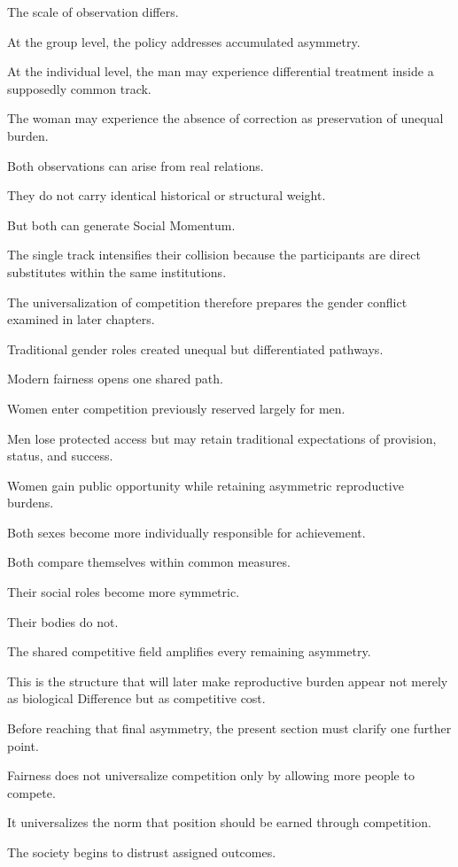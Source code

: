 The scale of observation differs.

At the group level, the policy addresses accumulated asymmetry.

At the individual level, the man may experience differential treatment inside a supposedly common track.

The woman may experience the absence of correction as preservation of unequal burden.

Both observations can arise from real relations.

They do not carry identical historical or structural weight.

But both can generate Social Momentum.

The single track intensifies their collision because the participants are direct substitutes within the same institutions.

The universalization of competition therefore prepares the gender conflict examined in later chapters.

Traditional gender roles created unequal but differentiated pathways.

Modern fairness opens one shared path.

Women enter competition previously reserved largely for men.

Men lose protected access but may retain traditional expectations of provision, status, and success.

Women gain public opportunity while retaining asymmetric reproductive burdens.

Both sexes become more individually responsible for achievement.

Both compare themselves within common measures.

Their social roles become more symmetric.

Their bodies do not.

The shared competitive field amplifies every remaining asymmetry.

This is the structure that will later make reproductive burden appear not merely as biological Difference but as competitive cost.

Before reaching that final asymmetry, the present section must clarify one further point.

Fairness does not universalize competition only by allowing more people to compete.

It universalizes the norm that position should be earned through competition.

The society begins to distrust assigned outcomes.


